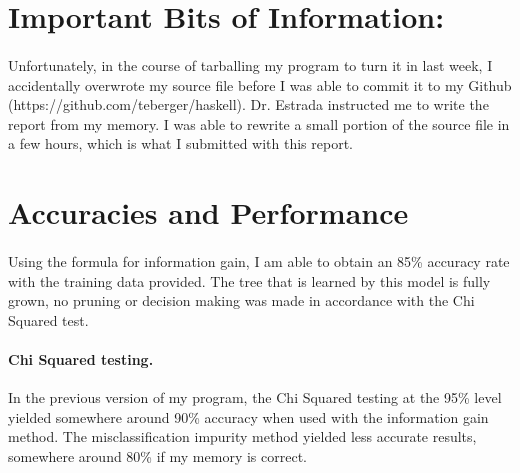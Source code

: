 \documentclass[12pt]{article}
\begin{document}
\section{Important Bits of Information:}
\paragraph{}Unfortunately, in the course of tarballing my program to turn it in last week, I accidentally overwrote my source file before I was able to commit it to my Github\\ (https://github.com/teberger/haskell). Dr. Estrada instructed me to write the report from my memory. I was able to rewrite a small portion of the source file in a few hours, which is what I submitted with this report. 

\section{Accuracies and Performance}
\paragraph{}Using the formula for information gain, I am able to obtain an 85\% accuracy rate with the training data provided. The tree that is learned by this model is fully grown, no pruning or decision making was made in accordance with the Chi Squared test. 
\paragraph{Chi Squared testing.} In the previous version of my program, the Chi Squared testing at the 95\% level yielded somewhere around 90\% accuracy when used with the information gain method. The misclassification impurity method yielded less accurate results, somewhere around 80\% if my memory is correct. 
\end{document}
